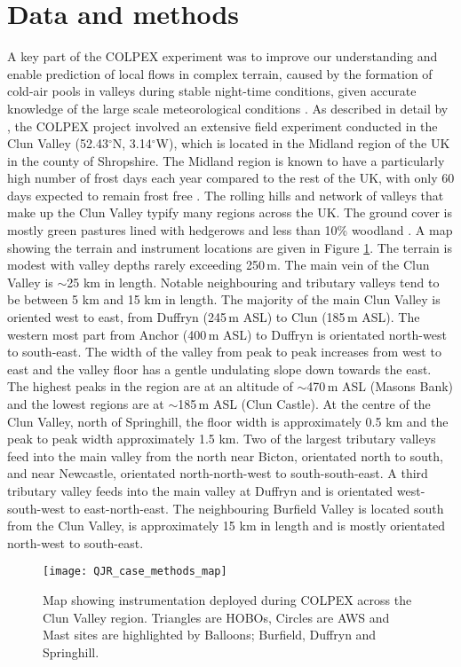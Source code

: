 \documentclass[times]{qjrms4}
\begin{document}
\section{Data and methods}
\label{methods}
A key part of the COLPEX experiment was to improve our understanding and enable prediction of local flows in complex terrain, caused by the formation of cold-air pools in valleys during stable night-time conditions, given accurate knowledge of the large scale meteorological conditions \citep{price2010COLPEX}. As described in detail by \citet{price2010COLPEX}, the COLPEX project involved an extensive field experiment conducted in the Clun Valley (52.43$^\circ$N, 3.14$^\circ$W), which is located in the Midland region of the UK in the county of Shropshire. The Midland region is known to have a particularly high number of frost days each year compared to the rest of the UK, with only 60 days expected to remain frost free \citep{KingandGiles1997}. The rolling hills and network of valleys that make up the Clun Valley typify many regions across the UK. The ground cover is mostly green pastures lined with hedgerows and less than 10\% woodland \citep{price2010COLPEX}. A map showing the terrain and instrument locations are given in Figure \ref{fig:MAP}. The terrain is modest with valley depths rarely exceeding 250$\,\mbox{m}$. The main vein of the Clun Valley is $\sim$25 km in length. Notable neighbouring and tributary valleys tend to be between 5 km and 15 km in length. The majority of the main Clun Valley is oriented west to east, from Duffryn (245$\,\mbox{m}$ ASL) to Clun (185$\,\mbox{m}$ ASL). The western most part from Anchor (400$\,\mbox{m}$ ASL) to Duffryn is orientated north-west to south-east. The width of the valley from peak to peak increases from west to east and the valley floor has a gentle undulating slope down towards the east. The highest peaks in the region are at an altitude of $\sim$470$\,\mbox{m}$ ASL (Masons Bank) and the lowest regions are at $\sim$185$\,\mbox{m}$ ASL (Clun Castle). At the centre of the Clun Valley, north of Springhill, the floor width is approximately 0.5 km and the peak to peak width approximately 1.5 km. Two of the largest tributary valleys feed into the main valley from the north near Bicton, orientated north to south, and near Newcastle, orientated north-north-west to south-south-east. A third tributary valley feeds into the main valley at Duffryn and is orientated west-south-west to east-north-east. The neighbouring Burfield Valley is located south from the Clun Valley, is approximately 15 km in length and is mostly orientated north-west to south-east.
%
	\begin{figure}
	\centering
	\texttt{[image: QJR\_case\_methods\_map]}
	\caption{Map showing instrumentation deployed during COLPEX across the Clun Valley region. Triangles are HOBOs, Circles are AWS and Mast sites are highlighted by Balloons; Burfield, Duffryn and Springhill.}
	\label{fig:MAP}
	\end{figure}
\end{document}
